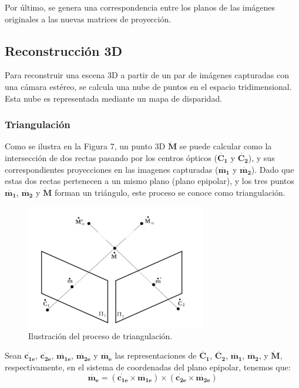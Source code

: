 \documentclass[11pt,a4paper,titlepage]{article}
\newcommand{\TwoCart}[1]{\ensuremath{\mathbf{\dot{#1}}}}
\newcommand{\ThreeCart}[1]{\ensuremath{\mathbf{\dot{#1}}}}
\newcommand{\Figure}[1]{Figura #1}
\begin{document}
Por último, se genera una correspondencia entre los planos de las imágenes originales a las nuevas matrices de proyección.

\subsection{Reconstrucción 3D}

Para reconstruir una escena 3D a partir de un par de imágenes capturadas con una cámara estéreo, se calcula una nube de puntos en el espacio tridimensional. Esta nube es representada mediante un mapa de disparidad.

\subsubsection{Triangulación}

Como se ilustra en la \Figure{7}, un punto 3D \ThreeCart{M} se puede calcular como la intersección de dos rectas pasando por los centros ópticos (\ThreeCart{C_1} y \ThreeCart{C_2}), y sus correspondientes proyecciones en las imagenes capturadas (\TwoCart{m_1} y \TwoCart{m_2}). Dado que estas dos rectas pertenecen a un mismo plano (plano epipolar), y los tres puntos \TwoCart{m_1}, \TwoCart{m_2} y \ThreeCart{M} forman un triángulo, este proceso se conoce como triangulación.


\begin{figure}[h!]

  \centering
    \includegraphics[width=0.7\textwidth]{f7.png}
  \caption{Ilustración del proceso de triangulación.}
\end{figure}

Sean \TwoCart{c_{1e}}, \TwoCart{c_{2e}}, \TwoCart{m_{1e}}, \TwoCart{m_{2e}} y \TwoCart{m_e} las representaciones de  \ThreeCart{C_1}, \ThreeCart{C_2}, \TwoCart{m_1}, \TwoCart{m_2}, y \ThreeCart{M}, respectivamente, en el sistema de coordenadas del plano epipolar, tenemos que:
\[
	\TwoCart{m_e} = (\TwoCart{c_{1e}} \times \TwoCart{m_{1e}}) \times (\TwoCart{c_{2e}} \times \TwoCart{m_{2e}})
\]
\end{document}
